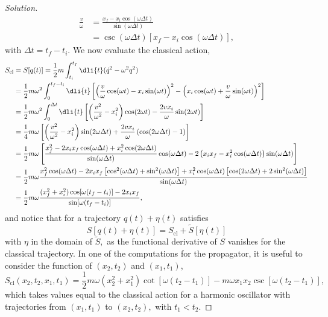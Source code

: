 \begin{proof}[Solution]
   \begin{align*}
      \frac{v}{\omega} &= \frac{x_f - x_i \cos(\omega \Delta t)}{\sin(\omega \Delta t)}\\
                       &= \csc(\omega \Delta t)\left[ x_f - x_i \cos(\omega \Delta t)\right],
   \end{align*}
   with \(\Delta t = t_f - t_i.\) We now evaluate the classical action,
   \begin{align*}
      S_{\mathrm{cl}} &= S[q(t)] = \frac12 m\int_{t_i}^{t_f} \dli{t} (\dot{q}^2 - \omega^2 q^2)\\
                      &= \frac12 m\omega^2 \int_{0}^{t_f-t_i} \dli{t} \left[\left(\frac{v}{\omega} \cos(\omega t)- x_i \sin(\omega t)\right)^2 - \left(x_i \cos(\omega t) + \frac{v}{\omega} \sin(\omega t)\right)^2\right]\\
                      &= \frac12 m \omega^2 \int_{0}^{\Delta t} \dli{t} \left[\left(\frac{v^2}{\omega^2} - x_i^2\right) \cos(2 \omega t ) - \frac{2v x_i}{\omega} \sin(2 \omega t)\right]\\
                      &= \frac14 m \omega \left[\left(\frac{v^2}{\omega^2} - x_i^2\right) \sin(2 \omega \Delta t) + \frac{2 v x_i}{\omega} \left(\cos(2 \omega \Delta t) - 1\right)\right]\\
                      &= \frac12 m \omega \left[\frac{x_f^2 - 2x_i x_f \cos(\omega \Delta t) + x_i^2 \cos(2 \omega \Delta t)}{\sin(\omega \Delta t)}\cos(\omega \Delta t) - 2\left(x_i x_f - x_i^2 \cos(\omega \Delta t)\right)\sin(\omega \Delta t)\right]\\
                      &= \frac12 m \omega \frac{x_f^2 \cos(\omega \Delta t) - 2x_i x_f \left[\cos^2(\omega \Delta t) + \sin^2(\omega \Delta t)\right] + x_i^2 \cos(\omega \Delta t) \left[\cos(2 \omega \Delta t) +2\sin^2(\omega \Delta t)\right]}{\sin(\omega \Delta t)}\\
                      &= \frac12 m \omega \frac{(x_f^2 + x_i^2) \cos[\omega (t_f - t_i)] - 2x_i x_f}{\sin[\omega (t_f - t_i)]},
   \end{align*}
   and notice that for a trajectory \(q(t) + \eta(t)\) satisfies
   \begin{equation*}
      S[q(t) + \eta(t)] = S_{\mathrm{cl}} + \tilde{S}[\eta(t)]
   \end{equation*}
   with \(\eta\) in the domain of \(\tilde{S},\) as the functional derivative of \(S\) vanishes for the classical trajectory. In one of the computations for the propagator, it is useful to consider the function of \((x_2, t_2)\) and \((x_1, t_1)\),
   \begin{equation*}
      S_{\mathrm{cl}}(x_2,t_2, x_1, t_1) = \frac12 m\omega (x_2^2 + x_1^2) \cot\left[\omega(t_2 - t_1)\right] - m \omega x_1 x_2 \csc\left[\omega(t_2 - t_1)\right],
   \end{equation*}
   which takes values equal to the classical action for a harmonic oscillator with trajectories from \((x_1, t_1)\) to \((x_2, t_2),\) with \(t_1 < t_2.\)


\end{proof}
